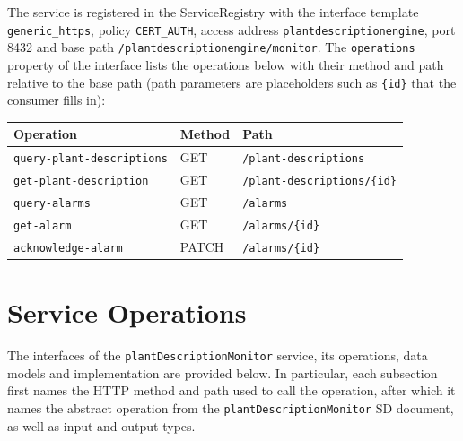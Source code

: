 \documentclass[a4paper]{arrowhead}
\begin{document}
The service is registered in the ServiceRegistry with the interface template \texttt{generic\_\allowbreak{}https}, policy \texttt{CERT\_\allowbreak{}AUTH}, access address \texttt{plantdescriptionengine}, port 8432 and base path \texttt{/\allowbreak{}plantdescriptionengine/\allowbreak{}monitor}. The \texttt{operations} property of the interface lists the operations below with their method and path relative to the base path (path parameters are placeholders such as \texttt{\{id\}} that the consumer fills in):

\noindent\begin{longtable}{| p{5.2cm} | p{1.6cm} | p{8.4cm} |} \hline
\rowcolor{gray!33} Operation & Method & Path \\ \hline \endhead
\texttt{query-\allowbreak{}plant-\allowbreak{}descriptions} & GET & \texttt{/\allowbreak{}plant-\allowbreak{}descriptions} \\ \hline
\texttt{get-\allowbreak{}plant-\allowbreak{}description} & GET & \texttt{/\allowbreak{}plant-\allowbreak{}descriptions/\allowbreak{}\{id\}} \\ \hline
\texttt{query-\allowbreak{}alarms} & GET & \texttt{/\allowbreak{}alarms} \\ \hline
\texttt{get-\allowbreak{}alarm} & GET & \texttt{/\allowbreak{}alarms/\allowbreak{}\{id\}} \\ \hline
\texttt{acknowledge-\allowbreak{}alarm} & PATCH & \texttt{/\allowbreak{}alarms/\allowbreak{}\{id\}} \\ \hline
\end{longtable}

\newpage

\section{Service Operations}
\label{sec:operations}

The interfaces of the \texttt{plant\allowbreak{}Description\allowbreak{}Monitor} service, its operations, data models and implementation are provided below.
In particular, each subsection first names the HTTP method and path used to call the operation, after which it names the abstract operation from the \texttt{plant\allowbreak{}Description\allowbreak{}Monitor} SD document, as well as input and output types.
\end{document}
